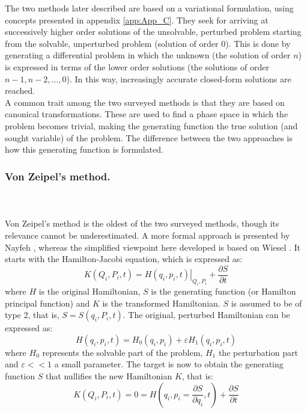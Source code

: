 	\indent The two methods later described are based on a variational formulation, using concepts presented in appendix \ref{app:App_C}. They seek for arriving at successively higher order solutions of the unsolvable, perturbed problem starting from the solvable, unperturbed problem (solution of order 0). This is done by generating a differential problem in which the unknown (\ie the solution of order $n$) is expressed in terms of the lower order solutions (\ie the solutions of order $n-1, n-2, \ldots, 0$). In this way, increasingly accurate closed-form solutions are reached.\\
	\indent A common trait among the two surveyed methods is that they are based on canonical transformations. These are used to find a phase space in which the problem becomes trivial, making the generating function the true solution (and sought variable) of the problem. The difference between the two approaches is how this generating function is formulated.
		\subsubsection{Von Zeipel's method.}
		\paragraph{  \\}
		\indent Von Zeipel's method is the oldest of the two surveyed methods, though its relevance cannot be underestimated. A more formal approach is presented by Nayfeh \cite{Nayfeh}, whereas the simplified viewpoint here developed is based on Wiesel \cite{Wiesel}. It starts with the Hamilton-Jacobi equation, which is expressed as:
		\begin{equation}
		K(Q_i, P_i, t) = \left. H(q_i, p_i, t)\right\rvert_{Q_i, P_i} + \dfrac{\partial S}{\partial t}
		\end{equation}
		\noindent where $H$ is the original Hamiltonian, $S$ is the generating function (or Hamilton principal function) and $K$ is the transformed Hamiltonian. $S$ is assumed to be of type 2, that is, $S = S(q_i, P_i, t)$. The original, perturbed Hamiltonian can be expressed as:
		\begin{equation}
		H(q_i, p_i, t) = H_0(q_i, p_i) + \varepsilon H_1 (q_i, p_i, t)
		\label{eqCh4:H0H1}
		\end{equation}
		\noindent where $H_0$ represents the solvable part of the problem, $H_1$ the perturbation part and $\varepsilon<<1$ a small parameter. The target is now to obtain the generating function $S$ that nullifies the new Hamiltonian $K$, that is:
		\begin{equation}
		K(Q_i, P_i, t) = 0 = H\left( q_i, p_i = \dfrac{\partial S}{\partial q_i}, t\right) + \dfrac{\partial S}{\partial t}
		\label{eqCh4:K_0}
		\end{equation}
